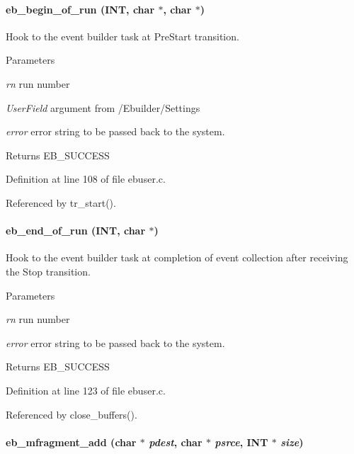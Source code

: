 \paragraph[{eb\_\-begin\_\-of\_\-run}]{ eb\_\-begin\_\-of\_\-run ({\bf INT}, \/  char $\ast$, \/  char $\ast$)}\hfill\label{mevb_8c_aac338f16c26978fda836e729d5c6e366}
Hook to the event builder task at PreStart transition. 
\begin{DoxyParams}{Parameters}
\item[{\em rn}]run number \item[{\em UserField}]argument from /Ebuilder/Settings \item[{\em error}]error string to be passed back to the system. \end{DoxyParams}
\begin{DoxyReturn}{Returns}
EB\_\-SUCCESS 
\end{DoxyReturn}


Definition at line 108 of file ebuser.c.

Referenced by tr\_\-start().
\paragraph[{eb\_\-end\_\-of\_\-run}]{ eb\_\-end\_\-of\_\-run ({\bf INT}, \/  char $\ast$)}\hfill\label{mevb_8c_a98d66006b73521032c8d02040f6cf4b8}
Hook to the event builder task at completion of event collection after receiving the Stop transition. 
\begin{DoxyParams}{Parameters}
\item[{\em rn}]run number \item[{\em error}]error string to be passed back to the system. \end{DoxyParams}
\begin{DoxyReturn}{Returns}
EB\_\-SUCCESS 
\end{DoxyReturn}


Definition at line 123 of file ebuser.c.

Referenced by close\_\-buffers().
\paragraph[{eb\_\-mfragment\_\-add}]{ eb\_\-mfragment\_\-add (char $\ast$ {\em pdest}, \/  char $\ast$ {\em psrce}, \/  {\bf INT} $\ast$ {\em size})}\hfill\label{mevb_8c_aa24716d8ff65fa3f0a2dbc5979ed486a}


